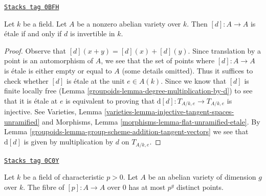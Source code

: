 \begin{lemma}
\label{groupoids-lemma-abelian-variety-multiplication-by-d-etale}
\href{https://stacks.math.columbia.edu/tag/0BFH}{\texttt{Stacks tag 0BFH}}


Let $k$ be a field. Let $A$ be a nonzero abelian variety over $k$.
Then $[d] : A \to A$ is \'etale if and only if $d$ is invertible in $k$.
\end{lemma}

\begin{proof}

Observe that $[d](x + y) = [d](x) + [d](y)$. Since translation by a
point is an automorphism of $A$, we see that the set of points where
$[d] : A \to A$ is \'etale is either empty or equal to $A$ (some details
omitted). Thus it suffices to check whether $[d]$ is \'etale at
the unit $e \in A(k)$. Since we know that $[d]$ is finite locally free
(Lemma \ref{groupoids-lemma-degree-multiplication-by-d})
to see that it is \'etale at $e$ is equivalent to
proving that $\text{d}[d] : T_{A/k, e} \to T_{A/k, e}$ is injective. See
Varieties, Lemma \ref{varieties-lemma-injective-tangent-spaces-unramified} and
Morphisms, Lemma \ref{morphisms-lemma-flat-unramified-etale}.
By Lemma \ref{groupoids-lemma-group-scheme-addition-tangent-vectors} we see that
$\text{d}[d]$ is given by multiplication by $d$ on $T_{A/k, e}$.
\end{proof}

\begin{lemma}
\label{groupoids-lemma-abelian-variety-multiplication-by-p}
\href{https://stacks.math.columbia.edu/tag/0C0Y}{\texttt{Stacks tag 0C0Y}}

Let $k$ be a field of characteristic $p > 0$. Let $A$ be an abelian variety
of dimension $g$
over $k$. The fibre of $[p] : A \to A$ over $0$ has at most
$p^g$ distinct points.
\end{lemma}

